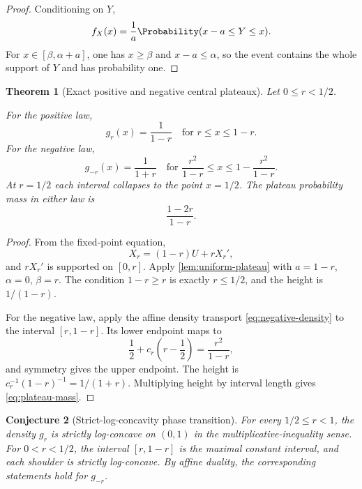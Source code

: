 \documentclass[11pt]{article}
\newtheorem{theorem}{Theorem}[section]
\newtheorem{conjecture}[theorem]{Conjecture}
\theoremstyle{definition}
\begin{document}
\begin{proof}
Conditioning on \(Y\),
\[
 f_X(x)=\frac1a\Probability(x-a\le Y\le x).
\]
For \(x\in[\beta,\alpha+a]\), one has \(x\ge\beta\) and \(x-a\le\alpha\), so the event
contains the whole support of \(Y\) and has probability one.
\end{proof}

\begin{theorem}[Exact positive and negative central plateaux]\label{thm:geometric-plateau}
Let \(0\le r<1/2\).

For the positive law,
\begin{equation}
 \boxed{
 g_r(x)=\frac1{1-r}\quad\text{for }r\le x\le1-r.}         \label{eq:positive-plateau}
\end{equation}
For the negative law,
\begin{equation}
 \boxed{
 g_{-r}(x)=\frac1{1+r}\quad\text{for }
 \frac{r^2}{1-r}\le x\le1-\frac{r^2}{1-r}.}              \label{eq:negative-plateau}
\end{equation}
At \(r=1/2\) each interval collapses to the point \(x=1/2\).  The plateau probability
mass in either law is
\begin{equation}
 \frac{1-2r}{1-r}.                                        \label{eq:plateau-mass}
\end{equation}
\end{theorem}

\begin{proof}
From the fixed-point equation,
\[
 X_r=(1-r)U+rX_r',
\]
and \(rX_r'\) is supported on \([0,r]\).  Apply
\cref{lem:uniform-plateau} with \(a=1-r\), \(\alpha=0\), \(\beta=r\).  The condition
\(1-r\ge r\) is exactly \(r\le1/2\), and the height is \(1/(1-r)\).

For the negative law, apply the affine density transport \cref{eq:negative-density} to
the interval \([r,1-r]\).  Its lower endpoint maps to
\[
 \frac12+c_r\left(r-\frac12\right)=\frac{r^2}{1-r},
\]
and symmetry gives the upper endpoint.  The height is
\(c_r^{-1}(1-r)^{-1}=1/(1+r)\).  Multiplying height by interval length gives
\cref{eq:plateau-mass}.
\end{proof}

\begin{conjecture}[Strict-log-concavity phase transition]\label{conj:strict-logconcavity}
For every \(1/2\le r<1\), the density \(g_r\) is strictly log-concave on \((0,1)\) in
the multiplicative-inequality sense.  For \(0<r<1/2\), the interval
\([r,1-r]\) is the maximal constant interval, and each shoulder is strictly
log-concave.  By affine duality, the corresponding statements hold for \(g_{-r}\).
\end{conjecture}
\end{document}
